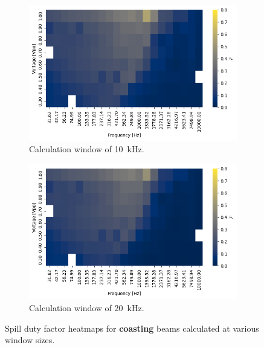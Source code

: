 \documentclass[a4paper,twoside,11pt]{report}
\begin{document}
\begin{appendices}
\begin{figure}[ht]
    \begin{subfigure}{.5\textwidth}
      \centering
      \includegraphics[width=.9\linewidth]{sdfs/off_10.png}
      \caption{Calculation window of \qty{10}{\kilo\hertz}.}
      \label{fig:sdf_off_10}
    \end{subfigure}%
    \begin{subfigure}{.5\textwidth}
      \centering
      \includegraphics[width=.9\linewidth]{sdfs/off_20.png}
      \caption{Calculation window of \qty{20}{\kilo\hertz}.}
      \label{fig:sdf_off_20}
    \end{subfigure}
    
    \caption{Spill duty factor heatmaps for \textbf{coasting} beams calculated at various window sizes.}
    \label{fig:sdf_off_grid}
    \end{figure}

\end{appendices}
\end{document}
